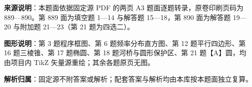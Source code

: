 

\begin{gknotice}
\textbf{来源说明}：本题面依据固定源 PDF 的两页 A3 题面逐题转录，原卷印刷页码为 889—890。第 889 面为填空题 1—14 与解答题 15—18，第 890 面为解答题 19—20 与附加题 21—23（第 21 题为四选二）。

\textbf{图形说明}：第 3 题程序框图、第 6 题频率分布直方图、第 12 题平行四边形、第 16 题三棱锥、第 17 题椭圆、第 18 题河桥与圆形保护区、第 21 题【A】圆，均由项目内 TikZ 矢量源重绘；其余各题原页无图。

\textbf{解析归属}：固定源不附答案或解析；配套答案与解析均由本库按本题面独立复算。
\end{gknotice}


